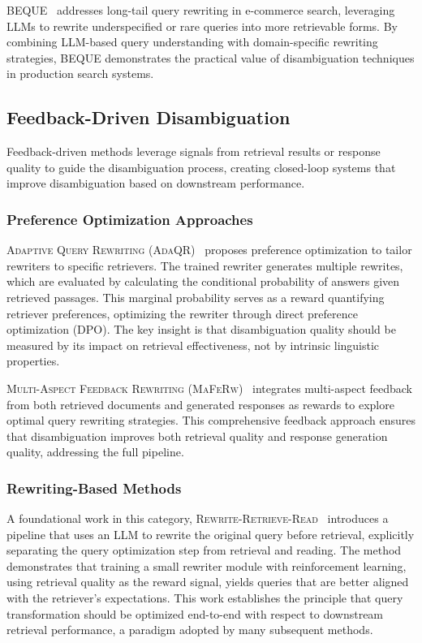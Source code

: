 \documentclass{article}
\begin{document}
\textsc{BEQUE}~\citep{BEQUE} addresses long-tail query rewriting in e-commerce search, leveraging LLMs to rewrite underspecified or rare queries into more retrievable forms. By combining LLM-based query understanding with domain-specific rewriting strategies, BEQUE demonstrates the practical value of disambiguation techniques in production search systems.

\subsection{Feedback-Driven Disambiguation}

Feedback-driven methods leverage signals from retrieval results or response quality to guide the disambiguation process, creating closed-loop systems that improve disambiguation based on downstream performance.

\subsubsection{Preference Optimization Approaches}

\textsc{Adaptive Query Rewriting (AdaQR)}~\citep{AdaQR} proposes preference optimization to tailor rewriters to specific retrievers. The trained rewriter generates multiple rewrites, which are evaluated by calculating the conditional probability of answers given retrieved passages. This marginal probability serves as a reward quantifying retriever preferences, optimizing the rewriter through direct preference optimization (DPO). The key insight is that disambiguation quality should be measured by its impact on retrieval effectiveness, not by intrinsic linguistic properties.

\textsc{Multi-Aspect Feedback Rewriting (MaFeRw)}~\citep{MaFeRw} integrates multi-aspect feedback from both retrieved documents and generated responses as rewards to explore optimal query rewriting strategies. This comprehensive feedback approach ensures that disambiguation improves both retrieval quality and response generation quality, addressing the full pipeline.

\subsubsection{Rewriting-Based Methods}

A foundational work in this category, \textsc{Rewrite-Retrieve-Read}~\citep{Rewrite-Retrieve-Read} introduces a pipeline that uses an LLM to rewrite the original query before retrieval, explicitly separating the query optimization step from retrieval and reading. The method demonstrates that training a small rewriter module with reinforcement learning, using retrieval quality as the reward signal, yields queries that are better aligned with the retriever's expectations. This work establishes the principle that query transformation should be optimized end-to-end with respect to downstream retrieval performance, a paradigm adopted by many subsequent methods.
\end{document}
